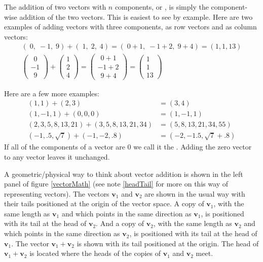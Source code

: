    The addition of two vectors with $n$ components, or , is simply the component-wise addition of the two vectors. This is 
easiest to see by example. Here are two examples of adding vectors with three 
components, as row vectors and as column vectors:
\begin{equation*}
\begin{gathered}
 (\; 0,\; -1,\; 9) + (\; 1,\; 2,\; 4) = (\; 0+1,\; -1+2,\; 9+4) = (1, 1, 13) \\[1em]
\begin{pmatrix}
~~0 \\ -1 \\ ~~9
\end{pmatrix}
+
\begin{pmatrix}
1 \\ 2   \\ 4
\end{pmatrix}
=
\begin{pmatrix}
~~0+1 \\ -1+2 \\ ~~9 +4
\end{pmatrix}
=
\begin{pmatrix}
1 \\ 1 \\ 13
\end{pmatrix}
\end{gathered}
\end{equation*}

Here are a few more examples:
\begin{align*}
(1,1) + (2,3) &= (3,4)  \\
(1,-1,1) + (0,0,0) &= (1,-1,1)  \\
(2,3,5,8,13,21) + (3,5,8,13,21,34) &= (5,8,13,21,34,55) \\
(-1,.5,\sqrt{7}) + (-1,-2,.8) &= (-2,-1.5,\sqrt{7}+.8)
\end{align*}
If all of the components of a vector are $0$ we call it the . Adding the zero vector to any vector leaves it unchanged.

   A geometric/physical way to think about vector addition is shown in the left 
panel of figure \ref{vectorMath} (see note \ref{headTail} for more on this way of representing vectors). The vectors $\mathbf{v}_1$ and 
$\mathbf{v}_2$ are shown in the usual way with their tails positioned at the 
origin of the vector space. A copy of $\mathbf{v}_1$, with the same length as 
$\mathbf{v}_1$ and which points in the same direction as $\mathbf{v}_1$, is 
positioned with its tail at the head of $\mathbf{v}_2$. And a copy of 
$\mathbf{v}_2$, with the same length as $\mathbf{v}_2$ and which points in the 
same direction as $\mathbf{v}_2$, is positioned with its tail at the head of 
$\mathbf{v}_1$. The vector $\mathbf{v}_1 + \mathbf{v}_2$ is shown with its 
tail positioned at the origin. The head of $\mathbf{v}_1 + \mathbf{v}_2$ is 
located where the heads of the copies of $\mathbf{v}_1$ and $\mathbf{v}_2$ 
meet. 

